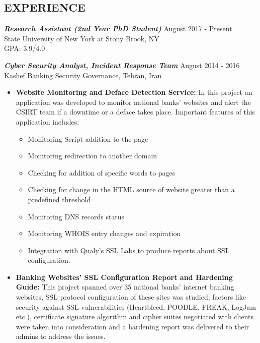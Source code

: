 \documentclass[margin, 10pt]{res} %
\begin{document}
\begin{resume}
 
\section{EXPERIENCE}

{\sl \textbf{Research Assistant (2nd Year PhD Student)}} \hfill August 2017 - Present \\
State University of New York at Stony Brook, NY \\
GPA: 3.9/4.0

{\sl \textbf{Cyber Security Analyst, Incident Response Team}} \hfill August 2014 - 2016 \\
Kashef  Banking  Security  Governance, Tehran, Iran\\
\begin{itemize} \itemsep -2pt %
\item \textbf{Website Monitoring and Deface Detection Service:} In  this  project  an  application  was  developed  to  monitor  national  banks’  websites and  alert  the  CSIRT  team  if  a  downtime  or  a  deface  takes  place. Important features of this application includes: 
    \begin{itemize} \itemsep -2pt %
        \item Monitoring Script addition to the  page
        \item Monitoring redirection  to another  domain
        \item Checking for addition of specific  words to pages
        \item Checking for change in the HTML source of website greater than a predefined threshold
        \item Monitoring DNS records status
        \item Monitoring WHOIS entry changes and expiration
        \item Integration with Qualy's SSL Labs to produce reports about SSL configuration.
    \end{itemize}
\end{itemize}

\begin{itemize} \itemsep -2pt %
\item \textbf{Banking Websites’ SSL Configuration Report and Hardening Guide:} This  project  spanned  over  35  national  banks’  internet  banking  websites,  SSL protocol configuration of these sites was studied, factors like security against SSL vulnerabilities  (Heartbleed,  POODLE,  FREAK,  LogJam  etc.),  certificate  signature algorithm  and  cipher  suites  negotiated  with  clients  were  taken  into  consideration and  a  hardening  report  was  delivered  to  their  admins  to  address  the  issues.
\end{itemize}


\end{resume}
\end{document}
